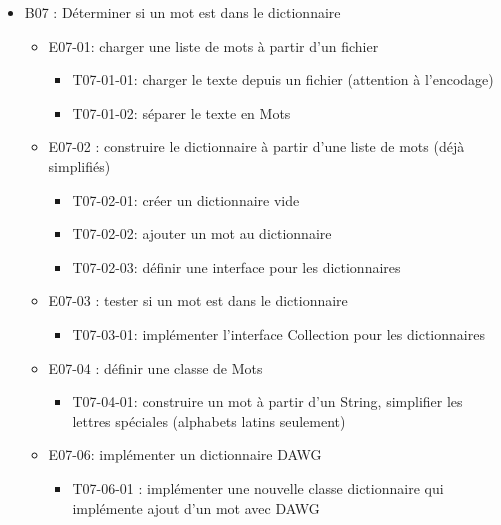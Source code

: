 \documentclass[a4paper,12pt]{article}
\begin{document}
\begin{itemize}
    \item B07 : Déterminer si un mot est dans le dictionnaire
    \begin{itemize}
        \item E07-01: charger une liste de mots à partir d’un fichier
        \begin{itemize}[label=$\square$]
            \item T07-01-01: charger le texte depuis un fichier (attention à l'encodage)
            \item T07-01-02: séparer le texte en Mots
        \end{itemize}
        \item E07-02 : construire le dictionnaire à partir d’une liste de mots (déjà simplifiés)
        \begin{itemize}[label=$\square$]
            \item T07-02-01: créer un dictionnaire vide
            \item T07-02-02: ajouter un mot au dictionnaire
            \item T07-02-03: définir une interface pour les dictionnaires
        \end{itemize}
        \item E07-03 : tester si un mot est dans le dictionnaire
        \begin{itemize}[label=$\square$]
            \item T07-03-01: implémenter l’interface Collection pour les dictionnaires
        \end{itemize}
        \item E07-04 : définir une classe de Mots
        \begin{itemize}[label=$\square$]
            \item T07-04-01: construire un mot à partir d’un String, simplifier les lettres spéciales (alphabets latins seulement)
        \end{itemize}
        \item E07-06: implémenter un dictionnaire DAWG
        \begin{itemize}[label=$\square$]
            \item T07-06-01 : implémenter une nouvelle classe dictionnaire qui implémente ajout d'un mot avec DAWG
        \end{itemize}
    \end{itemize}
\end{itemize}
\end{document}
